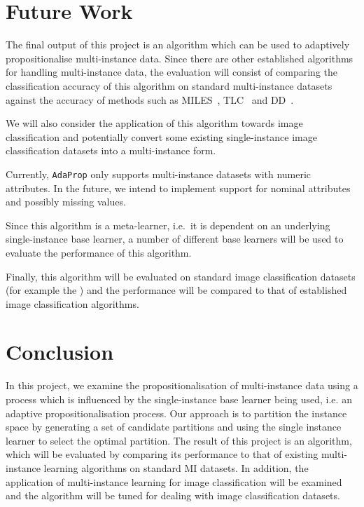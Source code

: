 \documentclass[a4paper,12pt]{article} %
\newcommand{\AdaProp}{\texttt{AdaProp}\xspace}
\begin{document}
\section{Future Work}

The final output of this project is an algorithm 
    which can be used to adaptively propositionalise multi-instance data. 
Since there are other established algorithms for handling multi-instance data, 
    the evaluation will consist of comparing the classification accuracy 
    of this algorithm on standard multi-instance datasets against 
    the accuracy of methods such as 
    MILES~\cite{Chen2006}, TLC~\cite{Weidmann2003} and DD~\cite{Maron98mil}.

We will also consider the application of this algorithm towards image classification and 
    potentially convert some existing single-instance image classification
    datasets into a multi-instance form.

Currently, \AdaProp only supports multi-instance datasets with 
    numeric attributes.
In the future, we intend to implement support for
    nominal attributes and possibly missing values.

Since this algorithm is a meta-learner, 
    i.e.\ it is dependent on an underlying single-instance base learner, 
    a number of different base learners will be 
    used to evaluate the performance of this algorithm.
 
Finally, this algorithm will be evaluated on 
    standard image classification datasets 
    (for example the ) and 
    the performance will be compared to that of 
    established image classification algorithms.

\section{Conclusion}
In this project, 
    we examine the propositionalisation of multi-instance data using 
    a process which is influenced by the single-instance base learner being used, 
    i.e. an adaptive propositionalisation process. 
Our approach is to partition the instance space 
    by generating a set of candidate partitions and 
    using the single instance learner to select the optimal partition. 
The result of this project is an algorithm, 
    which will be evaluated by comparing its performance to 
    that of existing multi-instance learning algorithms on standard MI datasets. 
In addition, 
    the application of multi-instance learning 
    for image classification will be examined and 
    the algorithm will be tuned for dealing with image classification datasets.
\clearpage
 

\end{document}
